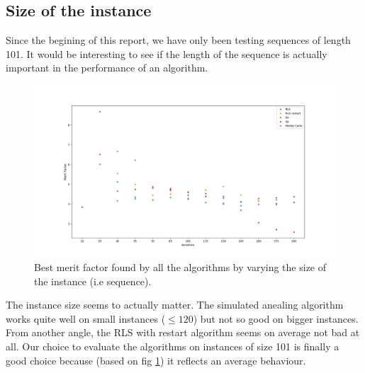 \documentclass[a4paper,11pt,openany]{article}
\begin{document}
\subsection{Size of the instance}
Since the begining of this report, we have only been testing sequences of length 101. It would be interesting to see if the length of the sequence is actually important in the performance of an algorithm.
\begin{figure}[H]
\begin{center}
\includegraphics[scale=0.26]{Images/instance_size}
\caption{Best merit factor found by all the algorithms by varying the size of the instance (i.e sequence).}
\label{fig:instance_size}
\end{center}
\end{figure}
\noindent
The instance size seems to actually matter. The simulated anealing algorithm works quite well on small instances ($\leq 120$) but not so good on bigger instances. From another angle, the RLS with restart algorithm seems on average not bad at all. Our choice to evaluate the algorithms on instances of size 101 is finally a good choice because (based on fig \ref{fig:instance_size}) it reflects an average behaviour.
\end{document}
